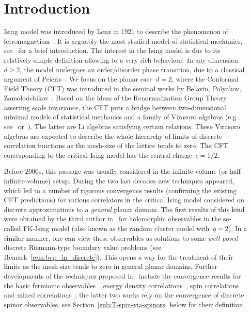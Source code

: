 \documentclass[reqno,11pt,a4paper]{amsart}
\theoremstyle{remark}
\begin{document}
\section{Introduction}
Ising model was introduced by Lenz in 1921 to describe the phenomenon of ferromagnetism~\cite{Len20}.
It is arguably the most studied model of statistical mechanics, see~\cite[Chapter~3]{FriVel17} for a brief introduction. 
The interest in the Ising model is due to its relatively simple definition allowing to a very rich behaviour.
In any dimension~$d\geq 2$, the model undergoes an order/disorder phase transition, due to a classical argument of Peierls~\cite{Pei36}.
We focus on the planar case~$d=2$, where the Conformal Field Theory (CFT) was introduced in the seminal works by Belavin, Polyakov, Zamolodchikov~\cite{BelPolZam84,BelPolZam84a}. 
Based on the ideas of the Renormalization Group Theory asserting scale invariance, the CFT puts a bridge between two-dimensional minimal models of statistical mechanics and a family of Virasoro algebras (e.g., see~\cite{DiFMatSen97} or~\cite{Mus10}). 
The latter are Li algebras satisfying certain relations. 
These Virasoro algebras are expected to describe the whole hierarchy of limits of discrete correlation functions as the mesh-size of the lattice tends to zero.
The CFT corresponding to the critical Ising model has the central charge~$c=1/2$.

Before 2000s, this passage was usually considered in the infinite-volume (or half-infinite-volume) setup. 
During the two last decades new techniques appeared, which led to a number of rigorous convergence results (confirming the existing CFT predictions) for various correlators in the critical Ising model considered on discrete approximations to a \emph{general} planar domain.
The first results of this kind were obtained by the third author in~\cite{Smi06,Smi10} for holomorphic observables in the so-called FK-Ising model (also known as the random cluster model with~$q=2$). 
In a similar manner, one can view these observables as solutions to some \emph{well-posed} discrete Riemann-type boundary value problems (see Remark~\ref{rem:bvp_in_discrete}). This opens a way for the treatment of their limits as the mesh-size tends to zero in general planar domains.
Further developments of the techniques proposed in~\cite{Smi06,Smi10} include the convergence results for the basic fermionic observables~\cite{CheSmi11}, energy density correlations~\cite{HonSmi11,Hon10}, spin correlations~\cite{CheIzy13,CheHonIzy15} and mixed correlations~\cite{CheHonIzy21}; the latter two works rely on the convergence of discrete spinor observables, see Section~\ref{sub:T-spin-via-spinors} below for their definition.
\end{document}
